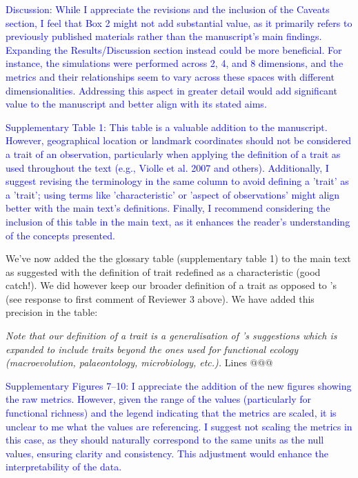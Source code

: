 \documentclass[
]{article}
\begin{document}
\textcolor{blue}{Discussion: While I appreciate the revisions and the inclusion of the Caveats section, I feel that Box 2 might not add substantial value, as it primarily refers to previously published materials rather than the manuscript's main findings.
Expanding the Results/Discussion section instead could be more beneficial.
For instance, the simulations were performed across 2, 4, and 8 dimensions, and the metrics and their relationships seem to vary across these spaces with different dimensionalities.
Addressing this aspect in greater detail would add significant value to the manuscript and better align with its stated aims.}


\textcolor{blue}{Supplementary Table 1: This table is a valuable addition to the manuscript.
However, geographical location or landmark coordinates should not be considered a trait of an observation, particularly when applying the definition of a trait as used throughout the text (e.g., Violle et al. 2007 and others).
Additionally, I suggest revising the terminology in the same column to avoid defining a 'trait' as a 'trait'; using terms like 'characteristic' or 'aspect of observations' might align better with the main text's definitions.
Finally, I recommend considering the inclusion of this table in the main text, as it enhances the reader's understanding of the concepts presented.}

We've now added the the glossary table (supplementary table 1) to the main text as suggested with the definition of trait redefined as a characteristic (good catch!).
We did however keep our broader definition of a trait as opposed to \cite{violle2007let}'s (see response to first comment of Reviewer 3 above).
We have added this precision in the table:

\textit{Note that our definition of a trait is a generalisation of \cite{violle2007let,mcgill2006rebuilding,dawson2021traits}'s suggestions which is expanded to include traits beyond the ones used for functional ecology (macroevolution, palaeontology, microbiology, etc.).} Lines @@@

\textcolor{blue}{Supplementary Figures 7–10: I appreciate the addition of the new figures showing the raw metrics.
However, given the range of the values (particularly for functional richness) and the legend indicating that the metrics are scaled, it is unclear to me what the values are referencing.
I suggest not scaling the metrics in this case, as they should naturally correspond to the same units as the null values, ensuring clarity and consistency.
This adjustment would enhance the interpretability of the data.}
\end{document}
